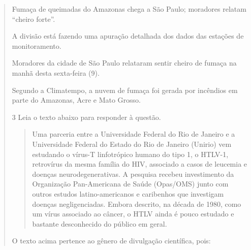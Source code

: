 \begin{quote}
\begin{escolha}

\item Fumaça de queimadas do Amazonas chega a São Paulo; moradores relatam ``cheiro forte''.

\item A divisão está fazendo uma apuração detalhada dos dados das estações de monitoramento.

\item Moradores da cidade de São Paulo relataram sentir cheiro de fumaça na manhã desta sexta-feira (9).

\item Segundo a Climatempo, a nuvem de fumaça foi gerada por incêndios em parte do Amazonas, Acre e Mato Grosso.

\end{escolha}


\num{3} Leia o texto abaixo para responder à questão.

\begin{quote}
Uma parceria entre a Universidade Federal do Rio de Janeiro e a
Universidade Federal do Estado do Rio de Janeiro (Unirio) vem estudando
o vírus-T linfotrópico humano do tipo 1, o HTLV-1, retrovírus da mesma
família do HIV, associado a casos de leucemia e doenças
neurodegenerativas. A pesquisa recebeu investimento da Organização
Pan-Americana de Saúde (Opas/OMS) junto com outros estudos
latino-americanos e caribenhos que investigam doenças negligenciadas.
Embora descrito, na década de 1980, como um vírus associado ao câncer, o
HTLV ainda é pouco estudado e bastante desconhecido do público em geral.
\end{quote}


O texto acima pertence ao gênero de divulgação científica, pois:


\end{quote}
